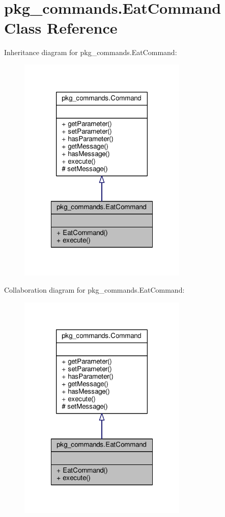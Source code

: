 \hypertarget{classpkg__commands_1_1EatCommand}{\section{pkg\-\_\-commands.\-Eat\-Command Class Reference}
\label{classpkg__commands_1_1EatCommand}
}


Inheritance diagram for pkg\-\_\-commands.\-Eat\-Command\-:
\nopagebreak
\begin{figure}[H]
\begin{center}
\leavevmode
\includegraphics[width=228pt]{classpkg__commands_1_1EatCommand__inherit__graph}
\end{center}
\end{figure}


Collaboration diagram for pkg\-\_\-commands.\-Eat\-Command\-:
\nopagebreak
\begin{figure}[H]
\begin{center}
\leavevmode
\includegraphics[width=228pt]{classpkg__commands_1_1EatCommand__coll__graph}
\end{center}
\end{figure}
